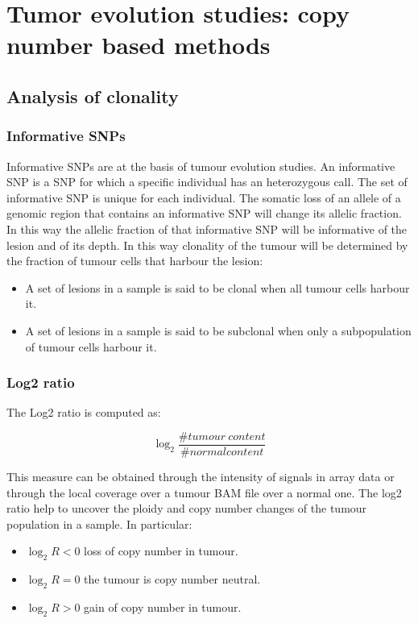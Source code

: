 \graphicspath{{chapters/notes/06/images/}}
\chapter{Tumor evolution studies: copy number based methods}

\section{Analysis of clonality}

  \subsection{Informative SNPs}
  Informative SNPs are at the basis of tumour evolution studies.
  An informative SNP is a SNP for which a specific individual has an heterozygous call.
  The set of informative SNP is unique for each individual.
  The somatic loss of an allele of a genomic region that contains an informative SNP will change its allelic fraction.
  In this way the allelic fraction of that informative SNP will be informative of the lesion and of its depth.
  In this way clonality of the tumour will be determined by the fraction of tumour cells that harbour the lesion:

  \begin{multicols}{2}
    \begin{itemize}
      \item A set of lesions in a sample is said to be clonal when all tumour cells harbour it.
      \item A set of lesions in a sample is said to be subclonal when only a subpopulation of tumour cells harbour it.
    \end{itemize}
  \end{multicols}

  \subsection{Log2 ratio}
  The Log2 ratio is computed as:

  $$\log_2\frac{\# tumour\ content}{\# normal content}$$

  This measure can be obtained through the intensity of signals in array data or through the local coverage over a tumour BAM file over a normal one.
  The log2 ratio help to uncover the ploidy and copy number changes of the tumour population in a sample.
  In particular:

  \begin{multicols}{3}
    \begin{itemize}
      \item $\log_2 R<0$ loss of copy number in tumour.
      \item $\log_2 R=0$ the tumour is copy number neutral.
      \item $\log_2 R >0$ gain of copy number in tumour.
    \end{itemize}
  \end{multicols}

